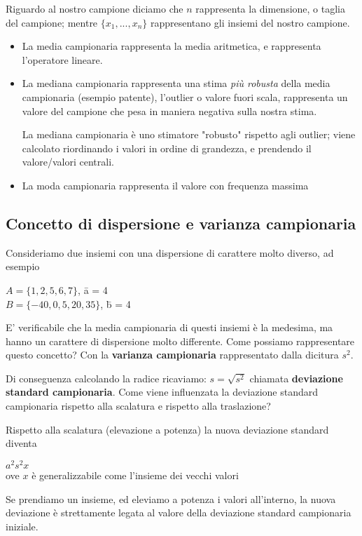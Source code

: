 Riguardo al nostro campione diciamo che $n$ rappresenta la dimensione, o taglia del campione; mentre ${\{x_1, ..., x_n\}}$ rappresentano gli insiemi del nostro campione.
\begin{itemize}
\item La media campionaria rappresenta la media aritmetica, e rappresenta l'operatore lineare. %
\item La mediana campionaria rappresenta una stima \emph{più robusta} della media campionaria (esempio patente), l'outlier o valore fuori scala, rappresenta un valore del campione che pesa in maniera negativa sulla nostra stima. 

La mediana campionaria è uno stimatore "robusto" rispetto agli outlier; viene calcolato riordinando i valori in ordine di grandezza, e prendendo il valore/valori centrali. %
\item La moda campionaria rappresenta il valore con frequenza massima
\end{itemize}

\subsection{Concetto di dispersione e varianza campionaria}
Consideriamo due insiemi con una dispersione di carattere molto diverso, ad esempio\begin{center}
$A = \{1, 2, 5, 6, 7\}$, \={a}  = 4\\
$B = \{-40, 0, 5, 20, 35\}$, \={b}  = 4\\
\end{center}
E' verificabile che la media campionaria di questi insiemi è la medesima, ma hanno un carattere di dispersione molto differente. Come possiamo rappresentare questo concetto? Con la \textbf{varianza campionaria} rappresentato dalla dicitura $s^2$. %

Di conseguenza calcolando la radice ricaviamo: $s = \sqrt{s^2}$ chiamata \textbf{deviazione standard campionaria}. Come viene influenzata la deviazione standard campionaria rispetto alla scalatura e rispetto alla traslazione? 

Rispetto alla scalatura (elevazione a potenza) la nuova deviazione standard diventa
\begin{center}
$a^2s^2x$\\
ove $x$ è generalizzabile come l'insieme dei vecchi valori
\end{center}
Se prendiamo un insieme, ed eleviamo a potenza i valori all'interno, la nuova deviazione è strettamente legata al valore della deviazione standard campionaria iniziale.

